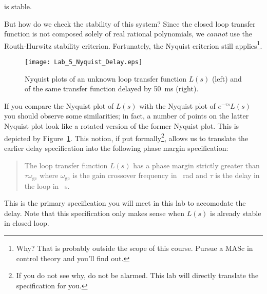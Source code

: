 \begin{center}
\end{center}
%
is stable.

But how do we check the stability of this system?
Since the closed loop transfer function is not composed solely of real rational polynomials, we \emph{cannot} use the Routh-Hurwitz stability criterion. Fortunately, the Nyquist criterion still applies\footnote{Why? That is probably outside the scope of this course. Pursue a MASc in control theory and you'll find out.}.
%
\begin{figure}
  \centering
  \texttt{[image: Lab\_5\_Nyquist\_Delay.eps]}
  \caption[Nyquist Plot of Transfer Functions with and without a delay.]{Nyquist plots of an unknown loop transfer function \(L(s)\) (left) and of the same transfer function delayed by \SI{50}{\milli\second} (right).}
  \label{fig:lab5:delay}
\end{figure}
%
If you compare the Nyquist plot of \(L(s)\) with the Nyquist plot of \(e^{-\tau s} L(s)\) you should observe some similarities;
in fact, a number of points on the latter Nyquist plot look like a rotated version of the former Nyquist plot.
This is depicted by Figure~\ref{fig:lab5:delay}.
This notion, if put formally\footnote{If you do not see why, do not be alarmed. This lab will directly translate the specification for you.}, allows us to translate the earlier delay specification into the following phase margin specification: 
\begin{quote}
  The loop transfer function \(L(s)\) has a phase margin strictly greater than \(\tau \omega_{\mathrm{gc}}\) where \(\omega_{\mathrm{gc}}\) is the gain crossover frequency in \SI{}{\radian} and \(\tau\) is the delay in the loop in \SI{}{\second}.
\end{quote}
This is the primary specification you will meet in this lab to accomodate the delay.
Note that this specification only makes sense when \(L(s)\) is already stable in closed loop.

